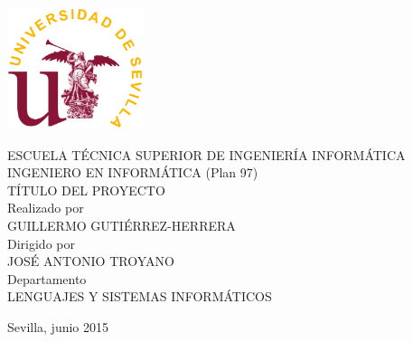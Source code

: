 
\newfontfamily{}

\thispagestyle{empty}

\begingroup

\begin{center}
\includegraphics[width=4cm]{logo_us}\\[1.5cm]

\Large

\portadafont

ESCUELA TÉCNICA SUPERIOR DE INGENIERÍA INFORMÁTICA\\[1cm]

INGENIERO EN INFORMÁTICA (Plan 97)\\[3cm]

TÍTULO DEL PROYECTO\\[2.5cm]

Realizado por\\[0.3cm]

GUILLERMO GUTIÉRREZ-HERRERA\\[1cm]

Dirigido por\\[0.3cm]

JOSÉ ANTONIO TROYANO\\[1cm]

Departamento\\[0.3cm]

LENGUAJES Y SISTEMAS INFORMÁTICOS\\[2.5cm]


\end{center}

\begin{flushright}
\portadafont
Sevilla, junio 2015
\end{flushright}

\endgroup
